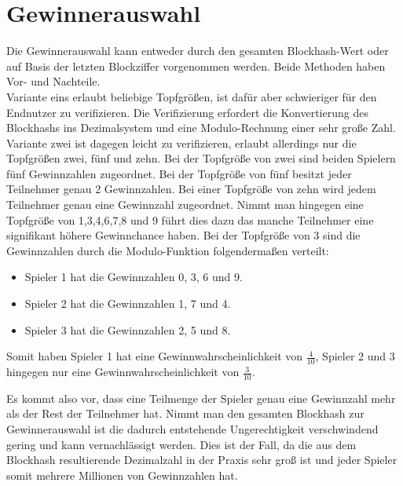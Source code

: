 \section{Gewinnerauswahl}\label{btc_gewinnerauswahl}
Die Gewinnerauswahl kann entweder durch den gesamten Blockhash-Wert oder auf Basis der letzten Blockziffer vorgenommen werden.
Beide Methoden haben Vor- und Nachteile.\\ Variante eins erlaubt beliebige Topfgrößen, ist dafür aber schwieriger für den Endnutzer zu verifizieren. Die Verifizierung erfordert die Konvertierung des Blockhashs ins Dezimalsystem und eine Modulo-Rechnung einer sehr große Zahl.\\ Variante zwei ist dagegen leicht zu verifizieren, erlaubt allerdings nur die Topfgrößen zwei, fünf und zehn. Bei der Topfgröße von zwei sind beiden Spielern fünf Gewinnzahlen zugeordnet. Bei der Topfgröße von fünf besitzt jeder Teilnehmer genau 2 Gewinnzahlen. Bei einer Topfgröße von zehn wird jedem Teilnehmer genau eine Gewinnzahl zugeordnet. 
Nimmt man hingegen eine Topfgröße von 1,3,4,6,7,8 und 9 führt dies dazu das manche Teilnehmer eine signifikant höhere Gewinnchance haben.
Bei der Topfgröße von 3 sind die Gewinnzahlen durch die Modulo-Funktion folgendermaßen verteilt:
\begin{itemize}
\item Spieler 1 hat die Gewinnzahlen 0, 3, 6 und 9.
\item Spieler 2 hat die Gewinnzahlen 1, 7 und 4.
\item Spieler 3 hat die Gewinnzahlen 2, 5 und 8.
\end{itemize}
Somit haben Spieler 1 hat eine Gewinnwahrscheinlichkeit von $\frac{4}{10}$, Spieler 2 und 3 hingegen nur eine Gewinnwahrscheinlichkeit von $\frac{3}{10}$.

Es kommt also vor, dass eine Teilmenge der Spieler genau eine Gewinnzahl mehr als der Rest der Teilnehmer hat.
Nimmt man den gesamten Blockhash zur Gewinnerauswahl ist die dadurch entstehende Ungerechtigkeit verschwindend gering und kann vernachlässigt werden. Dies ist der Fall, da die aus dem Blockhash resultierende Dezimalzahl in der Praxis sehr groß ist und jeder Spieler somit mehrere Millionen von Gewinnzahlen hat.

